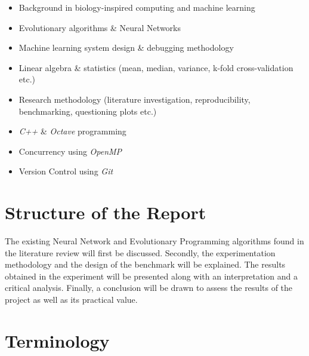 \documentclass[a4paper,12pt, oneside]{memoir}
\begin{document}
\begin{multicols}{2}
\begin{itemize}
  \setlength\itemsep{0.001em}
  \item Background in biology-inspired computing and machine learning
  \item Evolutionary algorithms \& Neural Networks
  \item Machine learning system design \& debugging methodology
  \item Linear algebra \& statistics (mean, median, variance, k-fold cross-validation etc.)
  \item Research methodology (literature investigation, reproducibility, benchmarking, questioning plots etc.)
  \item \textit{C++} \& \textit{Octave} programming
  \item Concurrency using \textit{OpenMP}
  \item Version Control using \textit{Git}
\end{itemize}
\end{multicols}

\newpage

\section{Structure of the Report}

The existing Neural Network and Evolutionary Programming algorithms found in the literature review will first be discussed. Secondly, the experimentation methodology and the design of the benchmark will be explained. The results obtained in the experiment will be presented along with an interpretation and a critical analysis. Finally, a conclusion will be drawn to assess the results of the project as well as its practical value.

\section{Terminology}
\end{document}
